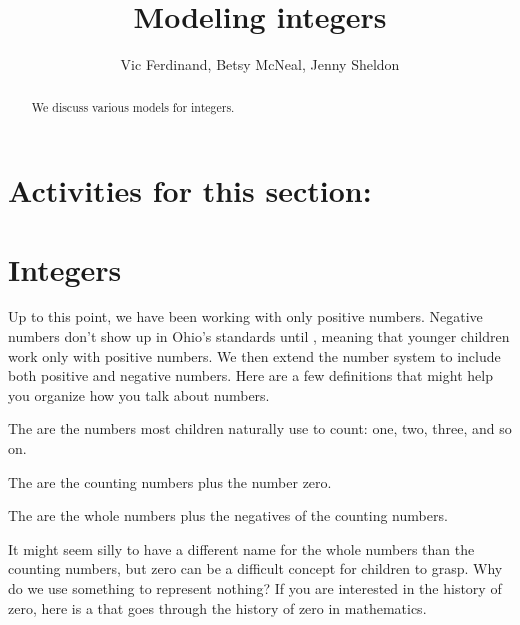 \documentclass{ximera}
\title{Modeling integers}
\author{Vic Ferdinand, Betsy McNeal, Jenny Sheldon}
\begin{document}
\begin{abstract}
We discuss various models for integers.
\end{abstract}
\maketitle

\section{Activities for this section:}


\section{Integers}

Up to this point, we have been working with only positive numbers. Negative numbers don't show up in Ohio's standards until , meaning that younger children work only with positive numbers. We then extend the number system to include both positive and negative numbers. Here are a few definitions that might help you organize how you talk about numbers.

\begin{definition}
The  are the numbers most children naturally use to count: one, two, three, and so on.
\end{definition}

\begin{definition}
The  are the counting numbers plus the number zero.
\end{definition}

\begin{definition}
The  are the whole numbers plus the negatives of the counting numbers.
\end{definition}

It might seem silly to have a different name for the whole numbers than the counting numbers, but zero can be a difficult concept for children to grasp. Why do we use something to represent nothing? If you are interested in the history of zero, here is a  that goes through the history of zero in mathematics. 
\end{document}
